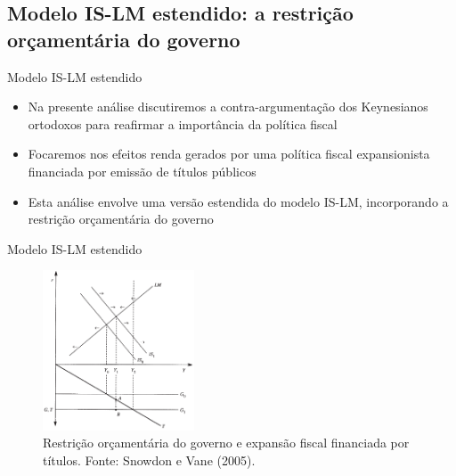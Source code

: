 \documentclass[10pt]{beamer}
\begin{document}
\subsection{Modelo IS-LM estendido: a restrição orçamentária do governo}
\begin{frame}{Modelo IS-LM estendido}
    \begin{itemize}
        \item Na presente análise discutiremos a contra-argumentação dos Keynesianos ortodoxos para reafirmar a importância da política fiscal
        \bigskip
        \item Focaremos nos efeitos renda gerados por uma política fiscal expansionista financiada por emissão de títulos públicos
        \bigskip
        \item Esta análise envolve uma versão estendida do modelo IS-LM, incorporando a restrição orçamentária do governo
    \end{itemize}
\end{frame}

\begin{frame}{Modelo IS-LM estendido}
    \begin{figure}
        \centering
        \includegraphics[width=0.4\textwidth]{./figures/aula06_fig5.PNG}
        \caption{Restrição orçamentária do governo e expansão fiscal financiada por títulos. Fonte: Snowdon e Vane (2005).}
        \label{fig5}
    \end{figure}
\end{frame}
\end{document}
